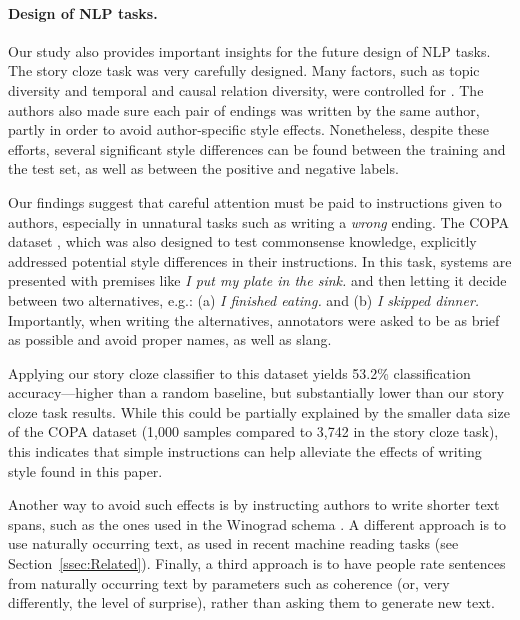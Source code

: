 \documentclass[11pt,a4paper]{article}
\newcommand{\secref}[1]{Section~\ref{ssec:#1}}
\newcommand{\roy}[1]{{\color{orange}\textsc{[#1 --rs]}}}
\renewcommand{\roy}[1]{{\color{orange}[#1 --rs]}}
\renewcommand{\roy}[1]{#1}
\begin{document}
\paragraph{Design of NLP tasks.}
Our study also provides important insights for the future design of NLP tasks. 
The story cloze task was very carefully designed. Many factors, such
as topic diversity and temporal and causal relation diversity,  were controlled for \cite{Mostafazadeh:2016}. 
The authors also made sure each pair of endings was written by the
same author, partly in order to avoid author-specific style effects.
 Nonetheless, despite these efforts, several significant style
 differences can be found between the training and the test set, as well as between the positive and negative labels. 
 
Our findings suggest that careful attention must be paid to instructions given to authors, especially in unnatural tasks such as writing a {\it wrong} ending. 
\roy{The COPA dataset \cite{Roemmele:2011}, which was also designed to test commonsense knowledge, explicitly addressed potential style differences in their instructions. In this task,  systems are presented with premises like {\it I put my plate in the sink.} and then letting it decide between two alternatives, e.g.: (a) {\it I finished eating.} and (b) {\it I skipped dinner.}}
Importantly, when writing the alternatives,  annotators were asked to be as brief as possible and avoid proper names, as well as  slang. 

Applying our story cloze classifier to this dataset yields 53.2\% classification accuracy---higher than a random baseline, but substantially lower than our story cloze task results. 
While this could be partially explained by the smaller data size of the COPA dataset (1,000 samples compared to 3,742 in the story cloze task), this indicates that simple instructions  can help alleviate the effects of writing style found in this paper.

Another way to avoid such effects is by instructing authors to write shorter text spans, such as the ones used in the Winograd schema \cite{Levesque:2011}.
A different approach is to use naturally occurring text, as used in recent machine reading tasks (see \secref{Related}). 
Finally, a third approach is to have people rate sentences from naturally occurring text by parameters
such as coherence (or, very differently, the level of surprise),
rather than asking them to generate new text.
\end{document}
